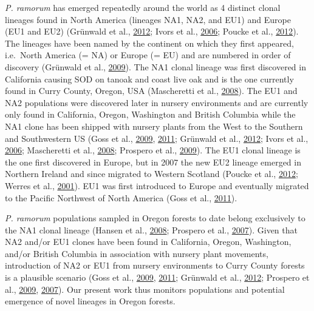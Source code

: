 \documentclass[double,12pt]{beavtex}
\begin{document}
  \emph{P. ramorum} has emerged repeatedly around the world as 4 distinct
  clonal lineages found in North America (lineages NA1, NA2, and EU1) and
  Europe (EU1 and EU2) (Grünwald et al.,
  \protect\hyperlink{ref-grunwald2012emergence}{2012}; Ivors et al.,
  \protect\hyperlink{ref-ivors2006microsatellite}{2006}; Poucke et al.,
  \protect\hyperlink{ref-vanpoucke2012discovery}{2012}). The lineages have
  been named by the continent on which they first appeared, i.e.~North
  America (= NA) or Europe (= EU) and are numbered in order of discovery
  (Grünwald et al.,
  \protect\hyperlink{ref-grunwald2009standardizing}{2009}). The NA1 clonal
  lineage was first discovered in California causing SOD on tanoak and
  coast live oak and is the one currently found in Curry County, Oregon,
  USA (Mascheretti et al.,
  \protect\hyperlink{ref-mascheretti2008reconstruction}{2008}). The EU1
  and NA2 populations were discovered later in nursery environments and
  are currently only found in California, Oregon, Washington and British
  Columbia while the NA1 clone has been shipped with nursery plants from
  the West to the Southern and Southwestern US (Goss et al.,
  \protect\hyperlink{ref-goss2009population}{2009},
  \protect\hyperlink{ref-goss2011phytophthora}{2011}; Grünwald et al.,
  \protect\hyperlink{ref-grunwald2012emergence}{2012}; Ivors et al.,
  \protect\hyperlink{ref-ivors2006microsatellite}{2006}; Mascheretti et
  al., \protect\hyperlink{ref-mascheretti2008reconstruction}{2008};
  Prospero et al., \protect\hyperlink{ref-prospero2009migration}{2009}).
  The EU1 clonal lineage is the one first discovered in Europe, but in
  2007 the new EU2 lineage emerged in Northern Ireland and since migrated
  to Western Scotland (Poucke et al.,
  \protect\hyperlink{ref-vanpoucke2012discovery}{2012}; Werres et al.,
  \protect\hyperlink{ref-werres2001phytophthora}{2001}). EU1 was first
  introduced to Europe and eventually migrated to the Pacific Northwest of
  North America (Goss et al.,
  \protect\hyperlink{ref-goss2011phytophthora}{2011}).
  
  \emph{P. ramorum} populations sampled in Oregon forests to date belong
  exclusively to the NA1 clonal lineage (Hansen et al.,
  \protect\hyperlink{ref-hansen2008epidemiology}{2008}; Prospero et al.,
  \protect\hyperlink{ref-prospero2007population}{2007}). Given that NA2
  and/or EU1 clones have been found in California, Oregon, Washington,
  and/or British Columbia in association with nursery plant movements,
  introduction of NA2 or EU1 from nursery environments to Curry County
  forests is a plausible scenario (Goss et al.,
  \protect\hyperlink{ref-goss2009population}{2009},
  \protect\hyperlink{ref-goss2011phytophthora}{2011}; Grünwald et al.,
  \protect\hyperlink{ref-grunwald2012emergence}{2012}; Prospero et al.,
  \protect\hyperlink{ref-prospero2009migration}{2009},
  \protect\hyperlink{ref-prospero2007population}{2007}). Our present work
  thus monitors populations and potential emergence of novel lineages in
  Oregon forests.
  
\end{document}
